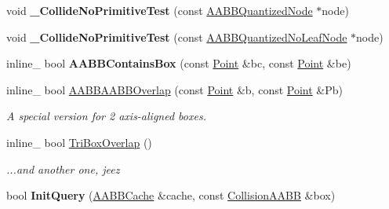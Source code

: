 \begin{DoxyCompactItemize}
\item 
void {\bfseries \+\_\+\+Collide\+No\+Primitive\+Test} (const \hyperlink{classAABBQuantizedNode}{A\+A\+B\+B\+Quantized\+Node} $\ast$node)\hypertarget{classAABBCollider_a700cf755f32326cd8c68c4bbcb3c4b1f}{}\label{classAABBCollider_a700cf755f32326cd8c68c4bbcb3c4b1f}

\item 
void {\bfseries \+\_\+\+Collide\+No\+Primitive\+Test} (const \hyperlink{classAABBQuantizedNoLeafNode}{A\+A\+B\+B\+Quantized\+No\+Leaf\+Node} $\ast$node)\hypertarget{classAABBCollider_a440e56705eec03a65d56a66a44f41bc7}{}\label{classAABBCollider_a440e56705eec03a65d56a66a44f41bc7}

\item 
inline\+\_\+ bool {\bfseries A\+A\+B\+B\+Contains\+Box} (const \hyperlink{classPoint}{Point} \&bc, const \hyperlink{classPoint}{Point} \&be)\hypertarget{classAABBCollider_abcd553e5b1275abfbad884f11968110a}{}\label{classAABBCollider_abcd553e5b1275abfbad884f11968110a}

\item 
inline\+\_\+ bool \hyperlink{classAABBCollider_ac423a1dbebf589fcb3f37e1e982476cf}{A\+A\+B\+B\+A\+A\+B\+B\+Overlap} (const \hyperlink{classPoint}{Point} \&b, const \hyperlink{classPoint}{Point} \&Pb)\hypertarget{classAABBCollider_ac423a1dbebf589fcb3f37e1e982476cf}{}\label{classAABBCollider_ac423a1dbebf589fcb3f37e1e982476cf}

\begin{DoxyCompactList}\small\item\em A special version for 2 axis-\/aligned boxes. \end{DoxyCompactList}\item 
inline\+\_\+ bool \hyperlink{classAABBCollider_a2339d6ef853a4a4a437e472e9ddfd659}{Tri\+Box\+Overlap} ()\hypertarget{classAABBCollider_a2339d6ef853a4a4a437e472e9ddfd659}{}\label{classAABBCollider_a2339d6ef853a4a4a437e472e9ddfd659}

\begin{DoxyCompactList}\small\item\em ...and another one, jeez \end{DoxyCompactList}\item 
bool {\bfseries Init\+Query} (\hyperlink{structAABBCache}{A\+A\+B\+B\+Cache} \&cache, const \hyperlink{classCollisionAABB}{Collision\+A\+A\+BB} \&box)\hypertarget{classAABBCollider_afc5a6945b3c809051fa20b5587047b68}{}\label{classAABBCollider_afc5a6945b3c809051fa20b5587047b68}

\end{DoxyCompactItemize}
